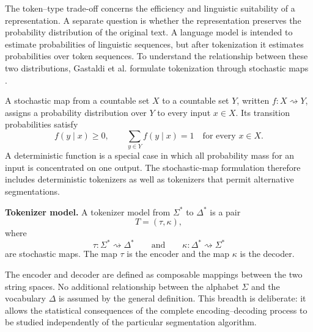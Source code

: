 The token--type trade-off concerns the efficiency and linguistic suitability of a representation. A separate question is whether the representation preserves the probability distribution of the original text. A language model is intended to estimate probabilities of linguistic sequences, but after tokenization it estimates probabilities over token sequences. To understand the relationship between these two distributions, Gastaldi et al. formulate tokenization through stochastic maps \parencite{gastaldi2025foundations}.

A stochastic map from a countable set \(X\) to a countable set \(Y\), written \(f:X\rightsquigarrow Y\), assigns a probability distribution over \(Y\) to every input \(x\in X\). Its transition probabilities satisfy
\begin{equation}
    f(y\mid x)\geq 0,
    \qquad
    \sum_{y\in Y}f(y\mid x)=1
    \quad\text{for every }x\in X.
    \label{eq:tokenizer-stochastic-map}
\end{equation}
A deterministic function is a special case in which all probability mass for an input is concentrated on one output. The stochastic-map formulation therefore includes deterministic tokenizers as well as tokenizers that permit alternative segmentations.

\begin{definition}
\textbf{Tokenizer model.}
A tokenizer model from \(\Sigma^*\) to \(\Delta^*\) is a pair
\[
    T=(\tau,\kappa),
\]
where
\[
    \tau:\Sigma^*\rightsquigarrow\Delta^*
    \qquad\text{and}\qquad
    \kappa:\Delta^*\rightsquigarrow\Sigma^*
\]
are stochastic maps. The map \(\tau\) is the encoder and the map \(\kappa\) is the decoder.
\label{def:tokenizer-stochastic-model}
\end{definition}

The encoder and decoder are defined as composable mappings between the two string spaces. No additional relationship between the alphabet \(\Sigma\) and the vocabulary \(\Delta\) is assumed by the general definition. This breadth is deliberate: it allows the statistical consequences of the complete encoding--decoding process to be studied independently of the particular segmentation algorithm.

